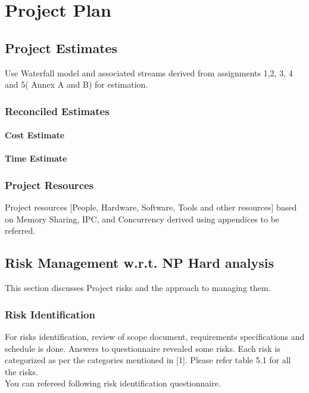 \documentclass{report} %
\begin{document}
	
	\chapter{Project Plan}
	\pagebreak	
		\section{Project Estimates}
		Use Waterfall model and associated streams derived from assignments 1,2, 3, 4 and
		5( Annex A and B) for estimation.
		
			\subsection{Reconciled Estimates}
		
				\subsubsection{Cost Estimate}
		
				\subsubsection{Time Estimate}
		
			\subsection{Project Resources}
			Project resources [People, Hardware, Software, Tools and other resources] based on Memory Sharing, IPC, and Concurrency derived using appendices to be referred.
		
		\section{Risk Management w.r.t. NP Hard analysis}
		This section discusses Project risks and the approach to managing them.
		
			\subsection{Risk Identification}
			For risks identification, review of scope document, requirements specifications and	schedule is done. Answers to questionnaire revealed some risks. Each risk is categorized	as per the categories mentioned in [1]. Please refer table 5.1 for all the risks. \\
			You can refereed following risk identification questionnaire. \\
			\vspace{\baselineskip}
			
\end{document}
